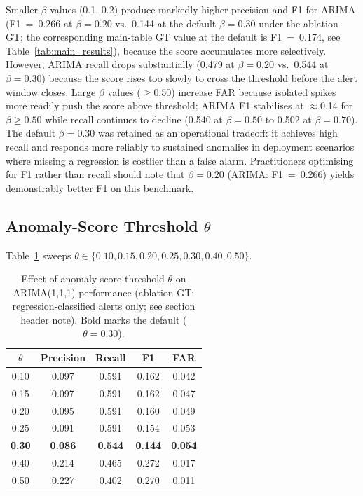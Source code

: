\documentclass[pdflatex,sn-nature]{sn-jnl}
\theoremstyle{thmstyleone}%
\begin{document}
Smaller $\beta$ values (0.1, 0.2) produce markedly higher precision and F1
for ARIMA (F1~=~0.266 at $\beta=0.20$ vs.\ 0.144 at the default $\beta=0.30$
under the ablation GT; the corresponding main-table GT value at the default
is F1~=~0.174, see Table~\ref{tab:main_results}),
because the score accumulates more selectively.
However, ARIMA recall drops substantially (0.479 at $\beta=0.20$ vs.~0.544 at $\beta=0.30$)
because the score rises too slowly to cross the threshold before the alert window
closes.
Large $\beta$ values ($\geq 0.50$) increase FAR because isolated spikes more readily push
the score above threshold; ARIMA F1 stabilises at $\approx$0.14 for $\beta \geq 0.50$
while recall continues to decline (0.540 at $\beta=0.50$ to 0.502 at $\beta=0.70$).
The default $\beta = 0.30$ was retained as an operational tradeoff: it achieves
high recall and responds more reliably to sustained anomalies in deployment
scenarios where missing a regression is costlier than a false alarm.
Practitioners optimising for F1 rather than recall should note that
$\beta = 0.20$ (ARIMA: F1~=~0.266) yields demonstrably better F1 on this benchmark.

\subsection{Anomaly-Score Threshold \texorpdfstring{$\theta$}{theta}}\label{sec:ablation:threshold}

Table~\ref{tab:ablation_threshold} sweeps $\theta \in \{0.10, 0.15, 0.20, 0.25,
0.30, 0.40, 0.50\}$.

\begin{table}[tbp]
\centering
\begin{tabular}{ccccc}
\toprule
$\theta$ & Precision & Recall & F1 & FAR \\
\midrule
0.10 & 0.097 & 0.591 & 0.162 & 0.042 \\
0.15 & 0.097 & 0.591 & 0.162 & 0.047 \\
0.20 & 0.095 & 0.591 & 0.160 & 0.049 \\
0.25 & 0.091 & 0.591 & 0.154 & 0.053 \\
\textbf{0.30} & \textbf{0.086} & \textbf{0.544} & \textbf{0.144} & \textbf{0.054} \\
0.40 & 0.214 & 0.465 & 0.272 & 0.017 \\
0.50 & 0.227 & 0.402 & 0.270 & 0.011 \\
\bottomrule
\end{tabular}
\caption{Effect of anomaly-score threshold $\theta$ on ARIMA(1,1,1) performance
  (ablation GT: regression-classified alerts only; see section header note).
  Bold marks the default ($\theta = 0.30$).}
\label{tab:ablation_threshold}
\end{table}
\end{document}
